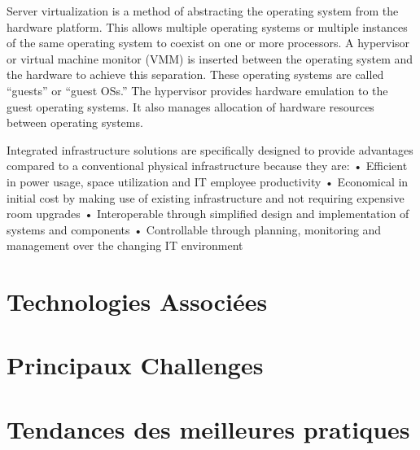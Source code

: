 Server virtualization is a method of abstracting the operating system from the hardware platform. This allows multiple operating systems or multiple instances of the same operating system to coexist on one or more processors. A hypervisor or virtual machine monitor (VMM) is inserted between the operating system and the hardware to achieve this separation. These operating systems are called “guests” or “guest OSs.” The hypervisor provides hardware emulation to the guest operating systems. It also manages allocation of hardware resources between operating systems.


Integrated infrastructure solutions are specifically designed to provide advantages compared to a conventional physical infrastructure because they are: 
•	 Efficient in power usage, space utilization and IT employee productivity
•	 Economical in initial cost by making use of existing infrastructure and not requiring expensive room upgrades
•	 Interoperable through simplified design and implementation of systems and components 
•	 Controllable through planning, monitoring and management over the changing IT environment

\section{Technologies Associées}

\section{Principaux Challenges}


\section{Tendances des meilleures pratiques}

